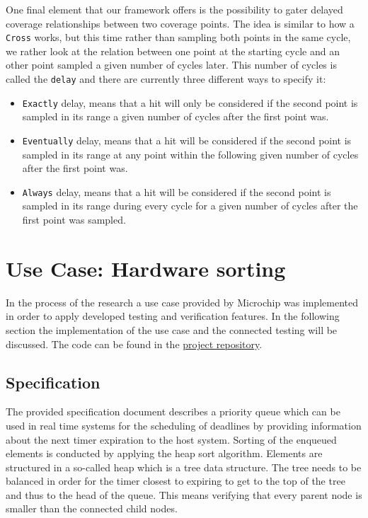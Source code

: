 \documentclass[conference]{IEEEtran}
\begin{document}
One final element that our framework offers is the possibility to gater delayed coverage relationships between two coverage points. The idea is similar to how a \texttt{Cross} works, but this time rather than sampling both points in the same cycle, we rather look at the relation between one point at the starting cycle and an other point sampled a given number of cycles later. This number of cycles is called the \texttt{delay} and there are currently three different ways to specify it:  
\begin{itemize}
 \item \texttt{Exactly} delay, means that a hit will only be considered if the second point is sampled in its range a given number of cycles after the first point was.
 \item \texttt{Eventually} delay, means that a hit will be considered if the second point is sampled in its range at any point within the following given number of cycles after the first point was.  
 \item \texttt{Always} delay, means that a hit will be considered if the second point is sampled in its range during every cycle for a given number of cycles after the first point was sampled.
\end{itemize}



\section{Use Case: Hardware sorting}

In the process of the research a use case provided by Microchip was implemented in order to apply developed testing and verification features.
In the following section the implementation of the use case and the connected testing will be discussed. The code can be found in the 
\href{https://github.com/chisel-uvm/chisel-verify/tree/master/src/main/scala/heappriorityqueue}{project repository}.

\subsection{Specification}

The provided specification document describes a priority queue which can be used in real time systems for the scheduling of deadlines by providing information about the 
next timer expiration to the host system. Sorting of the enqueued elements is conducted by applying the heap sort algorithm. Elements are structured in a so-called 
heap which is a tree data structure. The tree needs to be balanced in order for the
timer closest to expiring to get to the top of the tree and thus to the head of the queue. This means verifying that every parent node is smaller than the connected child nodes.
\end{document}
